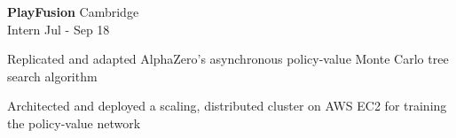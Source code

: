 \documentclass[letterpaper, 10pt]{article}
\begin{document}
\vspace{.5\baselineskip}
\textbf{PlayFusion} \hfill Cambridge\\
Intern \hfill Jul - Sep 18
\begin{compact}
	\item Replicated and adapted AlphaZero's asynchronous policy-value Monte Carlo tree search algorithm
	\item Architected and deployed a scaling, distributed cluster on AWS EC2 for training the policy-value network
\end{compact}
\end{document}
